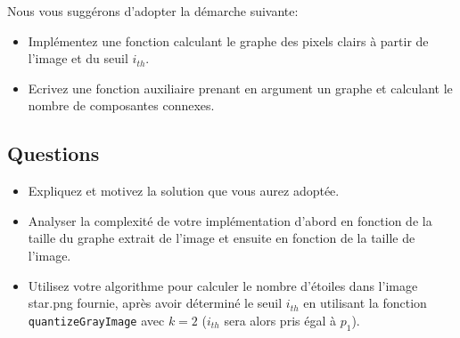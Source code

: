 \documentclass[a4paper,10pt]{article}
\begin{document}
Nous vous suggérons d'adopter la démarche suivante:
\begin{itemize}
\item Implémentez une fonction calculant le graphe des pixels clairs à partir de l'image et du seuil $i_{th}$.
\item Ecrivez une fonction auxiliaire prenant en argument un graphe et calculant le nombre de composantes connexes.
\end{itemize}

\subsection*{Questions}

\begin{itemize}
\item Expliquez et motivez la solution que vous aurez adoptée.
\item Analyser la complexité de votre implémentation d'abord en fonction de la
  taille du graphe extrait de l'image et ensuite en fonction de la taille de
  l'image.
\item Utilisez votre algorithme pour calculer le nombre d'étoiles dans
  l'image star.png fournie, après avoir déterminé le seuil $i_{th}$ en utilisant la fonction \texttt{quantizeGrayImage} avec $k=2$ ($i_{th}$ sera alors pris égal à $p_1$).
\end{itemize}
\end{document}
